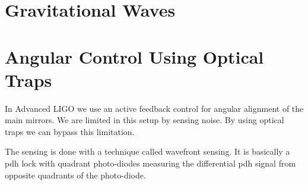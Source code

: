 \section{Gravitational Waves}


\section{Angular Control Using Optical Traps}

In Advanced LIGO we use an active feedback control for angular alignment of
the main mirrors.
We are limited in this setup by sensing noise.
By using optical traps we can bypass this limitation.

The sensing is done with a technique called wavefront sensing.
It is basically a \ac{pdh} lock with quadrant photo-diodes measuring
the differential \ac{pdh} signal from opposite quadrants of the photo-diode.

